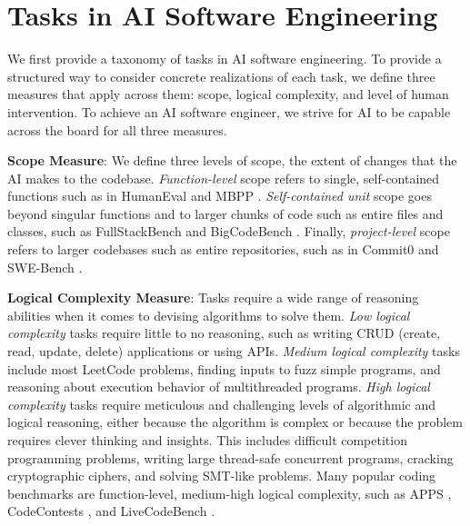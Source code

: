 \section{Tasks in AI Software Engineering} \label{sec:tasks-milestones}
We first provide a taxonomy of tasks in AI software engineering. To provide a structured way to consider concrete realizations of each task, we define three measures that apply across them: scope, logical complexity, and level of human intervention. To achieve an AI software engineer, we strive for AI to be capable across the board for all three measures.

\textbf{Scope Measure}: We define three levels of scope, the extent of changes that the AI makes to the codebase. \textit{Function-level} scope refers to single, self-contained functions such as in HumanEval \citep{chen2021evaluating} and MBPP \citep{austin2021program}. \textit{Self-contained unit} scope goes beyond singular functions and to larger chunks of code such as entire files and classes, such as FullStackBench \citep{liu2024fullstackbenchevaluatingllms} and BigCodeBench \citep{zhuo2024bigcodebench}. Finally, \textit{project-level} scope refers to larger codebases such as entire repositories, such as in Commit0 \citep{zhao2024commit0} and SWE-Bench \citep{jimenez2024swebench}.

\textbf{Logical Complexity Measure}: Tasks require a wide range of reasoning abilities when it comes to devising algorithms to solve them. \textit{Low logical complexity} tasks require little to no reasoning, such as writing CRUD (create, read, update, delete) applications or using APIs. \textit{Medium logical complexity} tasks include most LeetCode problems, finding inputs to fuzz simple programs, and reasoning about execution behavior of multithreaded programs. \textit{High logical complexity} tasks require meticulous and challenging levels of algorithmic and logical reasoning, either because the algorithm is complex or because the problem requires clever thinking and insights. This includes difficult competition programming problems, writing large thread-safe concurrent programs, cracking cryptographic ciphers, and solving SMT-like problems. Many popular coding benchmarks are function-level, medium-high logical complexity, such as APPS \citep{hendrycksapps2021}, CodeContests \citep{li2022competition}, and LiveCodeBench \citep{jain2024livecodebenchholisticcontaminationfree}. 

